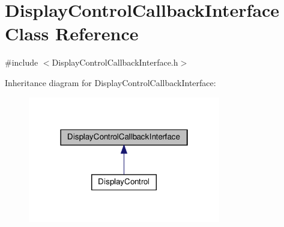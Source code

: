 \hypertarget{classDisplayControlCallbackInterface}{}\section{Display\+Control\+Callback\+Interface Class Reference}
\label{classDisplayControlCallbackInterface}


{\ttfamily \#include $<$Display\+Control\+Callback\+Interface.\+h$>$}



Inheritance diagram for Display\+Control\+Callback\+Interface\+:\nopagebreak
\begin{figure}[H]
\begin{center}
\leavevmode
\includegraphics[width=238pt]{classDisplayControlCallbackInterface__inherit__graph}
\end{center}
\end{figure}
